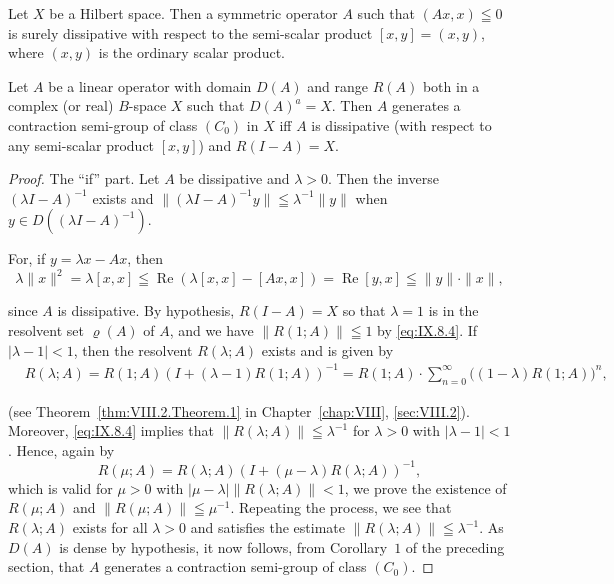 \begin{examplen} Let $X$ be a Hilbert space. Then a symmetric operator $A$ such that $(Ax, x) \leqq 0$ is surely dissipative with respect to the semi-scalar product $[x, y] = (x, y)$, where $(x, y)$ is the ordinary scalar product.

\end{examplen}
\begin{theoremn} Let $A$ be a linear operator with domain $D(A)$ and range $R(A)$ both in a complex (or real) $B$-space $X$ such that $D(A)^{a} = X$. Then $A$ generates a contraction semi-group of class $(C_{0})$ in $X$ iff $A$ is dissipative (with respect to any semi-scalar product $[x, y]$) and $R(I - A) = X$.

\end{theoremn}
\begin{proof}
 The ``if'' part. Let $A$ be dissipative and $\lambda > 0$. Then the inverse $(\lambda I - A)^{-1}$ exists and $\|(\lambda I - A)^{-1}y\| \leqq \lambda^{-1}\|y\|$ when $y \in D((\lambda I - A)^{-1})$. 

For, if $y = \lambda x - Ax$, then
\begin{equation}\label{eq:IX.8.4}
\lambda\|x\|^2=\lambda[x,x]\leqq\operatorname{Re}(\lambda[x,x]-[Ax,x])=\operatorname{Re}[y,x]\leqq\|y\|\cdot\|x\|,
\end{equation}

since $A$ is dissipative. By hypothesis, $R(I - A) = X$ so that $\lambda = 1$ is in the resolvent set $\varrho (A)$ of $A$, and we have $\|R(1;A)\|\leqq 1$ by \eqref{eq:IX.8.4}. If $|\lambda -1| < 1$, then the resolvent $R(\lambda ;A)$ exists and is given by 
\[
\begin{aligned}
&R (\lambda ; A)  = R (1; A) \left(I + (\lambda - 1) R (1; A)\right) ^{-1} = R (1; A) \cdot \sum\limits_{n=0} ^{\infty} \big ((1 - \lambda) R (1; A) \big) ^{n},
\end{aligned}
\]

(see Theorem~\ref{thm:VIII.2.Theorem.1} in Chapter~\ref{chap:VIII}, \ref{sec:VIII.2}). Moreover, \eqref{eq:IX.8.4} implies that $\|R(\lambda; A)\| \leqq \lambda^{-1}$ for $\lambda > 0$ with $|\lambda - 1| < 1$. Hence, again by 
\[
R (\mu ; A) = R (\lambda ; A) (I + (\mu - \lambda) R (\lambda ; A)) ^{-1},
\]
which is valid for $\mu > 0$ with $|\mu - \lambda| \|R(\lambda; A)\| < 1$, we prove the existence of $R(\mu; A)$ and $\|R(\mu; A)\| \leqq \mu^{-1}$. Repeating the process, we see that $R(\lambda; A)$ exists for all $\lambda > 0$ and satisfies the estimate $\|R(\lambda; A)\| \leqq \lambda^{-1}$. As $D(A)$ is dense by hypothesis, it now follows, from Corollary~\hyperref[cor:IX.7.Corollary.1]{$1$} of the preceding section, that $A$ generates a contraction semi-group of class $(C_0)$. 



\end{proof}
